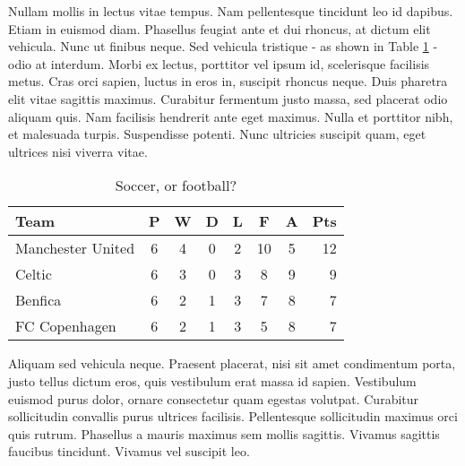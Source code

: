 Nullam mollis in lectus vitae tempus. Nam pellentesque tincidunt leo id dapibus. Etiam in euismod diam. \cite{ceres-solver, Asaro:1976:POT} Phasellus feugiat ante et dui rhoncus, at dictum elit vehicula. Nunc ut finibus neque. Sed vehicula tristique - as shown in Table \ref{soccer} - odio at interdum. Morbi ex lectus, porttitor vel ipsum id, scelerisque facilisis metus. Cras orci sapien, luctus in eros in, suscipit rhoncus neque. Duis pharetra elit vitae sagittis maximus. Curabitur fermentum justo massa, sed placerat odio aliquam quis. Nam facilisis hendrerit ante eget maximus. Nulla et porttitor nibh, et malesuada turpis. Suspendisse potenti. Nunc ultricies suscipit quam, eget ultrices nisi viverra vitae.

\begin{table}[ht]
\begin{center}
    \caption{Soccer, or football?}
\label{soccer}
\begin{tabular}{l*{6}{c}r}
Team              & P & W & D & L & F  & A & Pts \\
\hline
Manchester United & 6 & 4 & 0 & 2 & 10 & 5 & 12  \\
Celtic            & 6 & 3 & 0 & 3 &  8 & 9 &  9  \\
Benfica           & 6 & 2 & 1 & 3 &  7 & 8 &  7  \\
FC Copenhagen     & 6 & 2 & 1 & 3 &  5 & 8 &  7  \\
\end{tabular}
\end{center}
\end{table}

Aliquam sed vehicula neque. Praesent placerat, nisi sit amet condimentum porta, justo tellus dictum eros, quis vestibulum erat massa id sapien. Vestibulum euismod purus dolor, ornare consectetur quam egestas volutpat. Curabitur sollicitudin convallis purus ultrices facilisis. Pellentesque sollicitudin maximus orci quis rutrum. Phasellus a mauris maximus sem mollis sagittis. Vivamus sagittis faucibus tincidunt. Vivamus vel suscipit leo.

